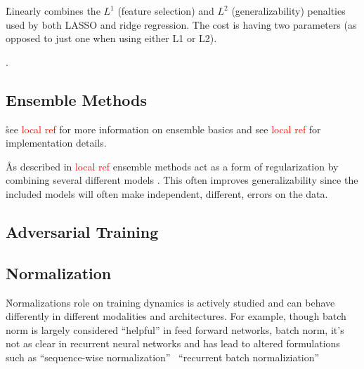 \r{Linearly combines the $L^1$ (feature selection) and $L^2$ (generalizability) penalties used by both LASSO and ridge regression. The cost is having two parameters (as opposed to just one when using either L1 or L2).}

.



\subsection{Ensemble Methods}

\r{see \textcolor{red}{local ref} for more information on ensemble basics and see \textcolor{red}{local ref} for implementation details.}

\r{As described in \textcolor{red}{local ref} ensemble methods act as a form of regularization by combining several different models . This often improves generalizability since the included models will often make independent, different, errors on the data.}

\subsection{Adversarial Training}




\subsection{Normalization}

\r{Normalizations role on training dynamics is actively studied and can behave differently in different modalities and architectures.  For example, though batch norm is largely considered ``helpful'' in feed forward networks, batch norm, it's not as clear in recurrent neural networks and has lead to altered formulations such as ``sequence-wise normalization''~\cite{Laurent2016BatchNR}  ``recurrent batch normaliziation''~\cite{DBLP:journals/corr/CooijmansBLC16}}






